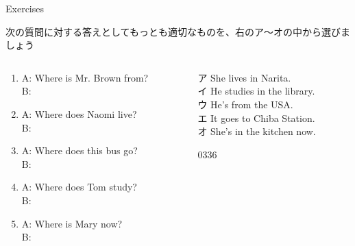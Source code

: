 \documentclass[aspectratio=169,xcolor={dvipsnames,table}]{beamer}
\begin{document}
\begin{frame}[plain]{Exercises}

 {\small 次の質問に対する答えとしてもっとも適切なものを、右のア～オの中から選びましょう}

\begin{columns}[t]
 \begin{column}{.475\textwidth}
\begin{enumerate}
 \item A: Where is Mr. Brown from?\\
B: 
 \item A: Where does Naomi live?\\
B: 
 \item A: Where does this bus go?\\
B: 
 \item A: Where does Tom study?\\
B: 
 \item A: Where is Mary now?\\
B: 
\end{enumerate}  
 \end{column}
\begin{column}{.475\textwidth}
\begin{tcolorbox}
ア She lives in Narita.\\
イ He studies in the library.\\
ウ He's from the USA.\\
エ It goes to Chiba Station.\\
オ She's in the kitchen now.
\end{tcolorbox} 
\mbox{}\hfill{\tiny 0336}\,{\scriptsize {}}
\end{column}
\end{columns}
\end{frame}
\end{document}
